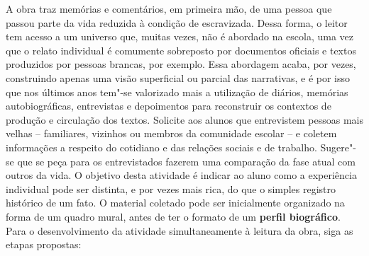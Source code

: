 \documentclass[12pt]{extarticle}
\begin{document}


A obra traz memórias e comentários, em primeira mão, de uma
pessoa que passou parte da vida reduzida à condição de escravizada.
Dessa forma, o leitor tem acesso a um universo que, muitas vezes, não é
abordado na escola, uma vez que o relato individual é comumente
sobreposto por documentos oficiais e textos produzidos por pessoas
brancas, por exemplo. Essa abordagem acaba, por vezes, construindo
apenas uma visão superficial ou parcial das narrativas, e é por isso que
nos últimos anos tem"-se valorizado mais a utilização de diários,
memórias autobiográficas, entrevistas e depoimentos para reconstruir os
contextos de produção e circulação dos textos. Solicite aos alunos que
entrevistem pessoas mais velhas -- familiares, vizinhos ou membros da
comunidade escolar -- e coletem informações a respeito do cotidiano e
das relações sociais e de trabalho. Sugere"-se que se peça para os
entrevistados fazerem uma comparação da fase atual com outros da vida. O
objetivo desta atividade é indicar ao aluno como a experiência
individual pode ser distinta, e por vezes mais rica, do que o simples
registro histórico de um fato. O material coletado pode ser inicialmente
organizado na forma de um quadro mural, antes de ter o formato de um
\textbf{perfil biográfico}. Para o desenvolvimento da atividade
simultaneamente à leitura da obra, siga as etapas propostas:
\end{document}
